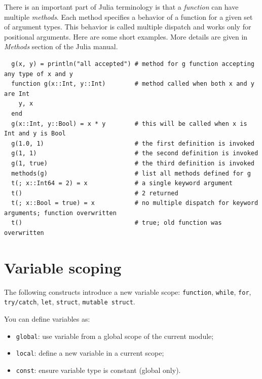 \documentclass[10pt,a4paper]{article}
\begin{document}
There is an important part of Julia terminology is that a \emph{function} can
have multiple \emph{methods}. Each method specifies a behavior of a function for
a given set of argument types. This behavior is called multiple dispatch and
works only for positional arguments. Here are some short examples. More details
are given in \emph{Methods} section of the Julia manual.
\begin{lstlisting}
  g(x, y) = println("all accepted") # method for g function accepting any type of x and y
  function g(x::Int, y::Int)        # method called when both x and y are Int
    y, x
  end
  g(x::Int, y::Bool) = x * y        # this will be called when x is Int and y is Bool
  g(1.0, 1)                         # the first definition is invoked
  g(1, 1)                           # the second definition is invoked
  g(1, true)                        # the third definition is invoked
  methods(g)                        # list all methods defined for g
  t(; x::Int64 = 2) = x             # a single keyword argument
  t()                               # 2 returned
  t(; x::Bool = true) = x           # no multiple dispatch for keyword arguments; function overwritten
  t()                               # true; old function was overwritten
\end{lstlisting}

\section{Variable scoping}
The following constructs introduce a new variable scope:
\lstinline|function|, \lstinline|while|,
\lstinline|for|, \lstinline|try/catch|,
\lstinline|let|, \lstinline|struct|, \lstinline|mutable struct|.

You can define variables as:
\begin{itemize}
  \item \lstinline|global|: use variable from a global scope of the current module;
  \item \lstinline|local|: define a new variable in a current scope;
  \item \lstinline|const|: ensure variable type is constant (global only).
\end{itemize}
\end{document}
